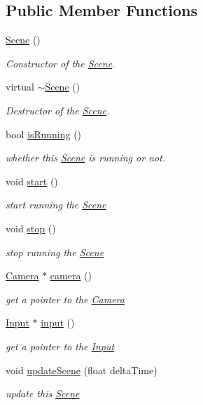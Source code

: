 \subsection*{Public Member Functions}
\begin{DoxyCompactItemize}
\item 
\hyperlink{class_scene_ad10176d75a9cc0da56626f682d083507}{Scene} ()
\begin{DoxyCompactList}\small\item\em Constructor of the \hyperlink{class_scene}{Scene}. \end{DoxyCompactList}\item 
\mbox{\label{class_scene_a3b8cec2e32546713915f8c6303c951f1}} 
virtual \hyperlink{class_scene_a3b8cec2e32546713915f8c6303c951f1}{$\sim$\+Scene} ()
\begin{DoxyCompactList}\small\item\em Destructor of the \hyperlink{class_scene}{Scene}. \end{DoxyCompactList}\item 
bool \hyperlink{class_scene_af6673f416884a66f46fd1e703d77de03}{is\+Running} ()
\begin{DoxyCompactList}\small\item\em whether this \hyperlink{class_scene}{Scene} is running or not. \end{DoxyCompactList}\item 
void \hyperlink{class_scene_af1c55c1cd88c6665609f5cba96dff226}{start} ()
\begin{DoxyCompactList}\small\item\em start running the \hyperlink{class_scene}{Scene} \end{DoxyCompactList}\item 
void \hyperlink{class_scene_add01794b17df2030e961468fc88cf2e7}{stop} ()
\begin{DoxyCompactList}\small\item\em stop running the \hyperlink{class_scene}{Scene} \end{DoxyCompactList}\item 
\hyperlink{class_camera}{Camera} $\ast$ \hyperlink{class_scene_a1845161fcd088622a1288a6c41bcd574}{camera} ()
\begin{DoxyCompactList}\small\item\em get a pointer to the \hyperlink{class_camera}{Camera} \end{DoxyCompactList}\item 
\hyperlink{class_input}{Input} $\ast$ \hyperlink{class_scene_ab8f8ccda2e6a954deb81d0f58c3b88bd}{input} ()
\begin{DoxyCompactList}\small\item\em get a pointer to the \hyperlink{class_input}{Input} \end{DoxyCompactList}\item 
void \hyperlink{class_scene_a7308b78f4cc3522369237623fd7a001f}{update\+Scene} (float delta\+Time)
\begin{DoxyCompactList}\small\item\em update this \hyperlink{class_scene}{Scene} \end{DoxyCompactList}\end{DoxyCompactItemize}
